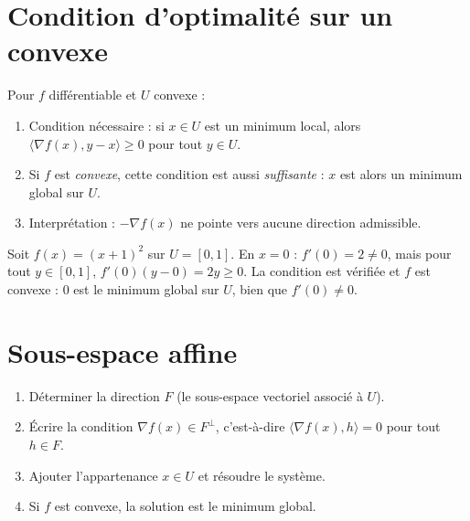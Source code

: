 
\section{Condition d'optimalité sur un convexe}

\begin{methode}
Pour $f$ différentiable et $U$ convexe :
\begin{enumerate}[label=\textbf{Étape \arabic*.}]
  \item Condition nécessaire : si $x\in U$ est un minimum local, alors $\langle\nabla f(x),y-x\rangle\ge0$ pour tout $y\in U$.
  \item Si $f$ est \emph{convexe}, cette condition est aussi \emph{suffisante} : $x$ est alors un minimum global sur $U$.
  \item Interprétation : $-\nabla f(x)$ ne pointe vers aucune direction admissible.
\end{enumerate}
\end{methode}

\begin{exemple}
Soit $f(x)=(x+1)^2$ sur $U=[0,1]$. En $x=0$ : $f'(0)=2\ne0$, mais pour tout $y\in[0,1]$, $f'(0)(y-0)=2y\ge0$. La condition est vérifiée et $f$ est convexe : $0$ est le minimum global sur $U$, bien que $f'(0)\neq0$.
\end{exemple}

\section{Sous-espace affine}

\begin{methode}[Minimum sur $U=x_0+F$]
\begin{enumerate}[label=\textbf{Étape \arabic*.}]
  \item Déterminer la direction $F$ (le sous-espace vectoriel associé à $U$).
  \item Écrire la condition $\nabla f(x)\in F^{\perp}$, c'est-à-dire $\langle\nabla f(x),h\rangle=0$ pour tout $h\in F$.
  \item Ajouter l'appartenance $x\in U$ et résoudre le système.
  \item Si $f$ est convexe, la solution est le minimum global.
\end{enumerate}
\end{methode}

